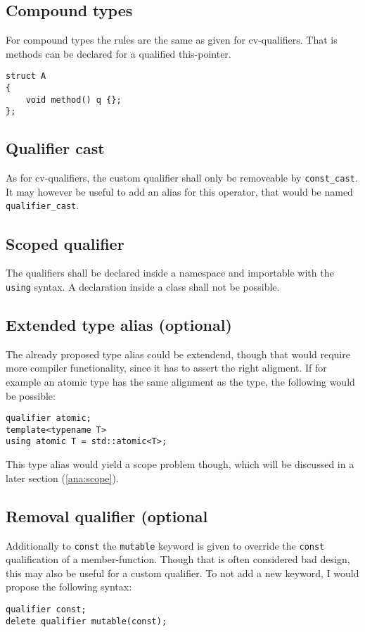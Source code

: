 \subsection{Compound types}
For compound types the rules are the same as given for cv-qualifiers. That is methods can be declared for a qualified this-pointer.
\begin{lstlisting}[firstnumber=4]
struct A
{
	void method() q {};
};
\end{lstlisting}
\subsection{Qualifier cast}
As for cv-qualifiers, the custom qualifier shall only be removeable by \lstinline {const_cast}. It may however be useful to add an alias for this operator, that would be named \lstinline {qualifier_cast}.
\subsection{Scoped qualifier}
The qualifiers shall be declared inside a namespace and importable with the \lstinline {using} syntax. A declaration inside a class shall not be possible. \subsection{Extended type alias (optional)}
The already proposed type alias could be extendend, though that would require more compiler functionality, since it has to assert the right aligment. If for example an atomic type has the same alignment as the type, the following would be possible:
\begin{lstlisting}
qualifier atomic;
template<typename T>
using atomic T = std::atomic<T>;
\end{lstlisting}
This type alias would yield a scope problem though, which will be discussed in a later section (\ref{ana:scope}).
\subsection{Removal qualifier (optional}
Additionally to \lstinline {const} the \lstinline {mutable} keyword is given to override the \lstinline {const} qualification of a member-function. Though that is often considered bad design, this may also be useful for a custom qualifier. To not add a new keyword, I would propose the following syntax:
\begin{lstlisting}
qualifier const;
delete qualifier mutable(const);
\end{lstlisting}
